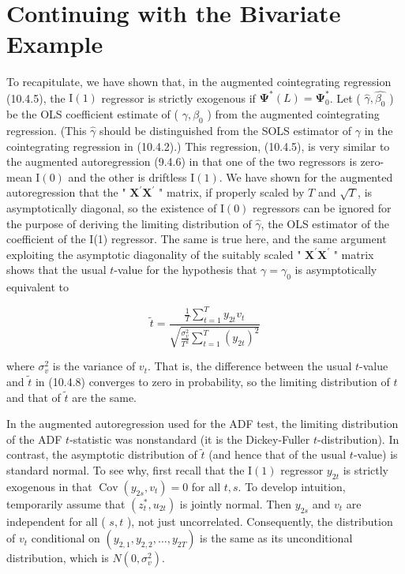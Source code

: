\documentclass[10pt]{article}
\begin{document}
\section*{Continuing with the Bivariate Example}
To recapitulate, we have shown that, in the augmented cointegrating regression (10.4.5), the $\mathrm{I}(1)$ regressor is strictly exogenous if $\boldsymbol{\Psi}^{*}(L)=\boldsymbol{\Psi}_{0}^{*}$. Let ( $\hat{\gamma}, \widehat{\beta_{0}}$ ) be the OLS coefficient estimate of ( $\gamma, \beta_{0}$ ) from the augmented cointegrating regression. (This $\hat{\gamma}$ should be distinguished from the SOLS estimator of $\gamma$ in the cointegrating regression in (10.4.2).) This regression, (10.4.5), is very similar to the augmented autoregression (9.4.6) in that one of the two regressors is zero-mean $\mathrm{I}(0)$ and the other is driftless $\mathrm{I}(1)$. We have shown for the augmented autoregression that the " $\mathbf{X}^{\prime} \mathbf{X}^{\prime}$ " matrix, if properly scaled by $T$ and $\sqrt{T}$, is asymptotically diagonal, so the existence of $\mathrm{I}(0)$ regressors can be ignored for the purpose of deriving the limiting distribution of $\hat{\gamma}$, the OLS estimator of the coefficient of the I(1) regressor. The same is true here, and the same argument exploiting the asymptotic diagonality of the suitably scaled " $\mathbf{X}^{\prime} \mathbf{X}^{\prime}$ " matrix shows that the usual $t$-value for the hypothesis that $\gamma=\gamma_{0}$ is asymptotically equivalent to


\begin{equation*}
\tilde{t}=\frac{\frac{1}{T} \sum_{t=1}^{T} y_{2 t} v_{t}}{\sqrt{\frac{\sigma_{v}^{2}}{T^{2}} \sum_{t=1}^{T}\left(y_{2 t}\right)^{2}}} \tag{10.4.8}
\end{equation*}


where $\sigma_{v}^{2}$ is the variance of $v_{t}$. That is, the difference between the usual $t$-value and $\tilde{t}$ in (10.4.8) converges to zero in probability, so the limiting distribution of $t$ and that of $\tilde{t}$ are the same.

In the augmented autoregression used for the ADF test, the limiting distribution of the ADF $t$-statistic was nonstandard (it is the Dickey-Fuller $t$-distribution). In contrast, the asymptotic distribution of $\tilde{t}$ (and hence that of the usual $t$-value) is standard normal. To see why, first recall that the $\mathrm{I}(1)$ regressor $y_{2 t}$ is strictly exogenous in that $\operatorname{Cov}\left(y_{2 s}, v_{t}\right)=0$ for all $t, s$. To develop intuition, temporarily assume that $\left(z_{t}^{*}, u_{2 t}\right)$ is jointly normal. Then $y_{2 s}$ and $v_{t}$ are independent for all ( $s, t$ ), not just uncorrelated. Consequently, the distribution of $v_{t}$ conditional on $\left(y_{2,1}, y_{2,2}, \ldots, y_{2 T}\right)$ is the same as its unconditional distribution, which is $N\left(0, \sigma_{v}^{2}\right)$.
\end{document}
